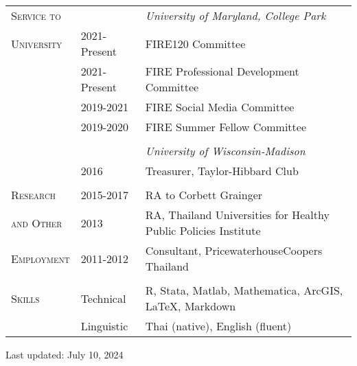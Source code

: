 \documentclass[letterpaper,11pt,oneside]{article}\usepackage[]{graphicx}\usepackage[]{xcolor}
\begin{document}
\noindent \begin{tabular}{p{1.2in} p{0.9in} l}                         
\textsc{Service to}		&               & \textit{University of Maryland, College Park} \\
\textsc{University}	  & 2021-Present  & FIRE120 Committee \\
                      & 2021-Present	& FIRE Professional Development Committee \\
                      & 2019-2021 	  & FIRE Social Media Committee \\
                      & 2019-2020 	  & FIRE Summer Fellow Committee \\
                      & & \\  
                      &               & \textit{University of Wisconsin-Madison} \\
                		  & 2016			    & Treasurer, Taylor-Hibbard Club\\
				              & 				      & \\
                        
\textsc{Research}		& 2015-2017	        & RA to Corbett Grainger\\
\textsc{and Other}	& 2013 				      & RA, Thailand Universities for Healthy Public Policies Institute\\
\textsc{Employment}	& 2011-2012 		    & Consultant, PricewaterhouseCoopers Thailand\\
                    & 				          & \\
\textsc{Skills}	& Technical   & R, Stata, Matlab, Mathematica, ArcGIS, \LaTeX, Markdown \\
        		    & Linguistic & Thai (native), English (fluent) \\
\end{tabular}

\begin{center} Last updated: July 10, 2024 \end{center}
					
\end{document}
